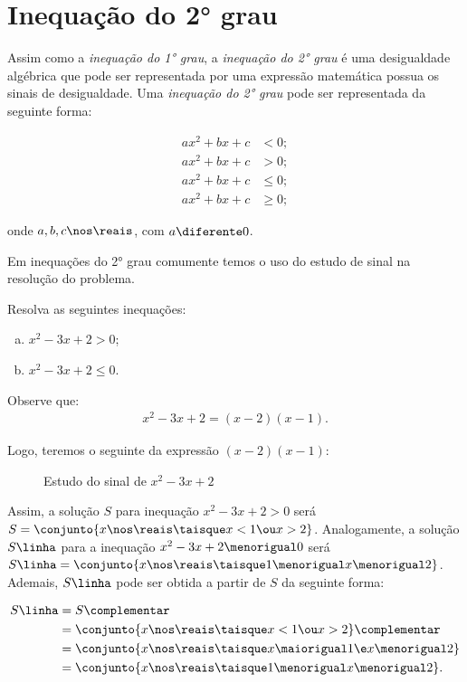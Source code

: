 \section{Inequação do 2° grau}

Assim como a \emph{inequação do 1° grau}, a \emph{inequação do 2° grau} é uma desigualdade algébrica que pode ser representada por uma expressão matemática possua os sinais de desigualdade. Uma \emph{inequação do 2° grau} pode ser representada da seguinte forma:

\begin{align*}
    ax^2 + bx + c &< 0;   \\
    ax^2 + bx + c &> 0;   \\
    ax^2 + bx + c &\le 0; \\
    ax^2 + bx + c &\ge 0;
\end{align*}

onde $a, b, c \nos \reais$, com $a \diferente 0$.

Em inequações do 2° grau comumente temos o uso do estudo de sinal na resolução do problema.  

\begin{example}
    Resolva as seguintes inequações:
    \begin{enumerate}[a)]
        \item $x^2 -3x +2 > 0$;
        \item $x^2 -3x +2 \le 0$.
    \end{enumerate}
\end{example}

Observe que: 
\begin{align*}
    x^2 - 3x + 2 = (x-2)(x-1).
\end{align*}

Logo, teremos o seguinte  da expressão $(x-2)(x-1)$:

\begin{figure}[H]
	\centering
	\caption{Estudo do sinal de $x^2 - 3x + 2$}
\end{figure}

Assim, a solução $S$ para inequação $x^2 -3x +2 > 0$ será $S = \conjunto{ x \nos \reais \taisque x < 1 \ou x > 2 }$. Analogamente, a solução $S\linha$ para a inequação $x^2 - 3x + 2 \menorigual 0$ será $S\linha = \conjunto{ x \nos \reais \taisque 1 \menorigual x \menorigual 2 }$. Ademais, $S\linha$ pode ser obtida a partir de $S$ da seguinte forma:

\begin{align*}
    S\linha &= S\complementar \\ 
            &= \conjunto{ x \nos \reais \taisque x < 1 \ou x > 2 }\complementar \\ 
            &= \conjunto{ x \nos \reais \taisque x \maiorigual 1 \e x \menorigual 2 } \\ 
            &= \conjunto{ x \nos \reais \taisque 1 \menorigual x \menorigual 2 }.
\end{align*}